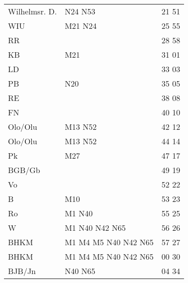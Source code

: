 \begin{tabular}{!{\color{schiefergrau}\vrule width 3pt}*{3}{l!{\color{schiefergrau}\vrule width 3pt}}}
\hline
{}
 \\
\hline
Wilhelmsr. D.& \nbus{} N24 N53                                            & 21 51 \\
WIU          & \mbus{} M21 \nbus{} N24                                    & 25 55 \\
RR           &                                                            & 28 58 \\
KB           & \mbus{} M21                                                & 31 01 \\
LD           &                                                            & 33 03 \\
PB           & \nbus{} N20                                                & 35 05 \\
RE           &                                                            & 38 08 \\
FN           &                                                            & 40 10 \\
Olo/Olu      & \nuneun{} \mtram{} M13 \nbus{} N52                         & 42 12 \\
\hline
Olo/Olu      & \nuneun{} \mtram{} M13 \nbus{} N52                         & 44 14 \\
Pk           & \mbus{} M27                                                & 47 17 \\
BGB/Gb       &                                                            & 49 19 \\
Vo           &                                                            & 52 22 \\
B            & \mtram{} M10                                               & 53 23 \\
Ro           & \mtram{} M1 \nbus{} N40                                    & 55 25 \\
W            & \nuzwei{} \nufuenf{} \mtram{} M1 \nbus{} N40 N42 N65       & 56 26 \\
BHKM         & \nuzwei{} \nufuenf{} \mtram{} M1 M4 M5 \nbus{} N40 N42 N65 & 57 27 \\
\hline
BHKM         & \nuzwei{} \nufuenf{} \mtram{} M1 M4 M5 \nbus{} N40 N42 N65 & 00 30 \\
BJB/Jn       & \nbus{} N40 N65                                            & 04 34 \\

\end{tabular}
